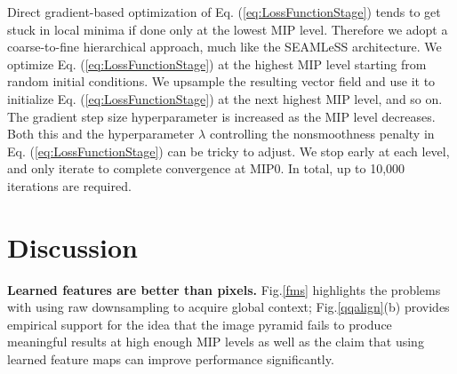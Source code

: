 \documentclass{article}
\begin{document}
Direct gradient-based optimization of Eq. (\ref{eq:LossFunctionStage}) tends to get stuck in local minima if done only at the lowest MIP level. Therefore we adopt a coarse-to-fine hierarchical approach, much like the SEAMLeSS architecture. We optimize Eq. (\ref{eq:LossFunctionStage}) at the highest MIP level starting from random initial conditions. We upsample the resulting vector field and use it to initialize Eq. (\ref{eq:LossFunctionStage}) at the next highest MIP level, and so on. The gradient step size hyperparameter is increased as the MIP level decreases. Both this and the hyperparameter $\lambda$ controlling the nonsmoothness penalty in Eq. (\ref{eq:LossFunctionStage}) can be tricky to adjust. We stop early at each level, and only iterate to complete convergence at MIP0. In total, up to 10,000 iterations are required.



\section{Discussion} %


\textbf{Learned features are better than pixels. } Fig.\ref{fms} highlights the problems with using raw downsampling to acquire global context; Fig.\ref{qqalign}(b) provides empirical support for the idea that the image pyramid fails to produce meaningful results at high enough MIP levels as well as the claim that using learned feature maps can improve performance significantly.



\end{document}
